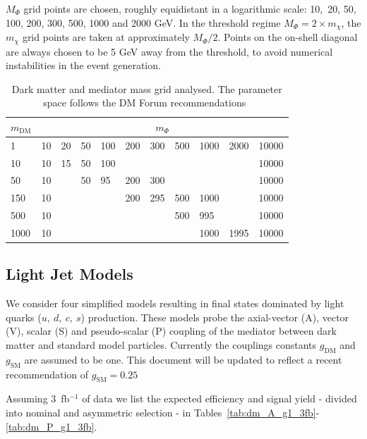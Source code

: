 $M_{\Phi}$ grid points are chosen, roughly equidistant in a logarithmic
scale: 10,~20, 50, 100, 200, 300, 500, 1000 and 2000 GeV. In the  threshold
regime $M_{\Phi} = 2 \times m_{\chi}$, the $ m_{\chi}$ grid points are taken at approximately $M_{\Phi}/2$. Points on the on-shell diagonal are always chosen to be
5 GeV away from the threshold, to avoid numerical instabilities in the event generation. 


\begin{table}[h!]
\centering
\begin{tabular}{l|llllllllll}\hline \hline
$m_\textrm{DM}$  & \multicolumn{10}{c}{$m_\Phi$}                                   \\ \hline
1    & 10 & 20 & 50 & 100 & 200 & 300 & 500 & 1000 & 2000 & 10000 \\
10   & 10 & 15 & 50 & 100 &     &     &     &      &      & 10000 \\
50   & 10 &    & 50 & 95  & 200 & 300 &     &      &      & 10000 \\
150  & 10 &    &    &     & 200 & 295 & 500 & 1000 &      & 10000 \\
500  & 10 &    &    &     &     &     & 500 & 995  &      & 10000 \\
1000 & 10 &    &    &     &     &     &     & 1000 & 1995 & 10000\\ \hline
\hline
\end{tabular}
\caption{Dark matter and mediator mass grid analysed. The parameter space follows the DM Forum recommendations~\cite{Abercrombie:2015wmb}}
\label{tab:DMgrid}
\end{table}

\subsection{Light Jet Models}


We consider four simplified models resulting in final states dominated by light quarks ($u,~d,~c,~s$) production. These models probe the axial-vector (A), vector (V), scalar (S) and pseudo-scalar (P) coupling of the mediator between dark matter and standard model particles. Currently the couplings constants $g_\textrm{DM}$ and $g_\textrm{SM}$ are assumed to be one. This document will be updated to reflect a recent recommendation of $g_\textrm{SM}=0.25$

Assuming 3~fb$^{-1}$ of data we list the expected efficiency and signal yield - divided into nominal and asymmetric selection - in Tables~\ref{tab:dm_A_g1_3fb}-\ref{tab:dm_P_g1_3fb}.

